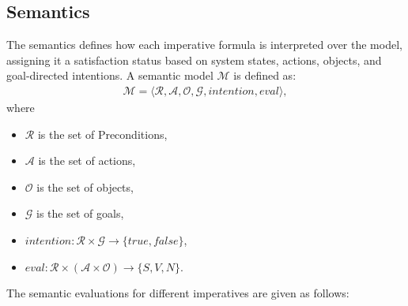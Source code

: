 \documentclass[a4paper,11pt]{lmcs}
\begin{document}
\subsection{Semantics}
The semantics defines how each imperative formula is interpreted over the model, assigning it a satisfaction status based on system states, actions, objects, and goal-directed intentions.
A semantic model \(\mathcal{M}\) is defined as:
\begin{eqnarray}
\label{eq:model}
\mathcal{M} = \langle \mathcal{R}, \mathcal{A}, \mathcal{O}, \mathcal{G}, intention, eval \rangle,
\end{eqnarray}
where
\begin{itemize}
    \item \(\mathcal{R}\) is the set of Preconditions,
    \item \(\mathcal{A}\) is the set of actions,
    \item \(\mathcal{O}\) is the set of objects,
    \item \(\mathcal{G}\) is the set of goals,
    \item \(intention : \mathcal{R} \times \mathcal{G} \to \{ true, false \}\),
    \item \(eval : \mathcal{R} \times (\mathcal{A} \times \mathcal{O}) \to \{ S, V, N \}\).
\end{itemize}

The semantic evaluations for different imperatives are given as follows:
\end{document}
